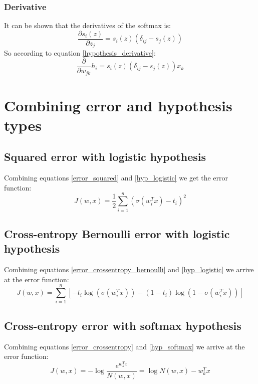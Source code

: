 \documentclass[12pt, a4paper]{article}
\numberwithin{equation}{section}
\begin{document}
\subsubsection{Derivative}
It can be shown that the derivatives of the softmax is:
\begin{equation}
\frac{\partial s_i(z)}{\partial z_j}=s_i(z)(\delta_{ij}-s_j(z))
\end{equation}
So according to equation \ref{hypothesis_derivative}:
\begin{equation}
\frac{\partial}{\partial w_{jk}}h_i=s_i(z)(\delta_{ij}-s_j(z))x_k
\end{equation}

\section{Combining error and hypothesis types}

\subsection{Squared error with logistic hypothesis}
Combining equations \ref{error_squared} and \ref{hyp_logistic} we get the error function:
\begin{equation}
J(w,x)=\frac{1}{2}\sum_{i=1}^n(\sigma(w_i^T x)-t_i)^2
\end{equation}

\subsection{Cross-entropy Bernoulli error with logistic hypo\-thesis}
Combining equations \ref{error_crossentropy_bernoulli} and \ref{hyp_logistic} we arrive at the error function:
\begin{equation}
J(w,x)=\sum_{i=1}^n\left[-t_i\log(\sigma(w_i^T x))-(1-t_i)\log(1-\sigma(w_i^T x))\right]
\end{equation}

\subsection{Cross-entropy error with softmax hypothesis}
Combining equations \ref{error_crossentropy} and \ref{hyp_softmax} we arrive at the error function:
\begin{equation}
J(w,x)=-\log\frac{e^{w_k^T x}}{N(w,x)}=\log N(w,x)-w_k^T x
\end{equation}
\end{document}
